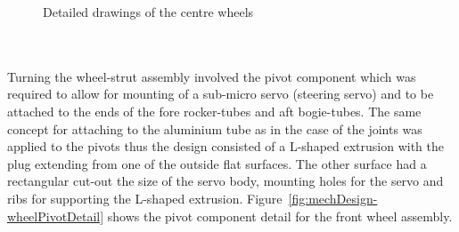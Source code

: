         \begin{figure}[H]
        \centering
        \qquad
        \caption[Detailed drawings of the centre wheels]{Detailed drawings of the centre wheels}
        \label{fig:mechDesign-midWheelDetail}
        \end{figure}
          
      \\\\
        Turning the wheel-strut assembly involved the pivot component which was required to allow for mounting of a sub-micro servo (steering servo) and to be attached to the ends of the fore rocker-tubes and aft bogie-tubes. The same concept for attaching to the aluminium tube as in the case of the joints was applied to the pivots thus the design consisted of a L-shaped extrusion with the plug extending from one of the outside flat surfaces. The other surface had a rectangular cut-out the size of the servo body, mounting holes for the servo and ribs for supporting the L-shaped extrusion. Figure~\ref{fig:mechDesign-wheelPivotDetail} shows the pivot component detail for the front wheel assembly.
        
